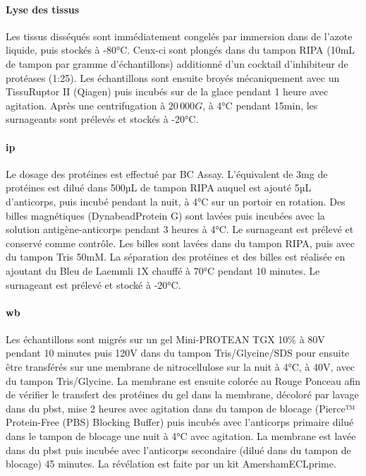 \paragraph{Lyse des tissus}
\label{par:lyse}
	Les tissus disséqués sont immédiatement congelés par immersion dans de l'azote liquide, puis stockés à -80°C. Ceux-ci sont plongés dans du tampon RIPA (10mL de tampon par gramme d'échantillons) additionné d'un cocktail d'inhibiteur de protéases (1:25). Les échantillons sont ensuite broyés mécaniquement avec un TissuRuptor II (Qiagen\textregistered) puis incubés sur de la glace pendant 1 heure avec agitation. Après une centrifugation à $20\,000G$, à 4°C pendant 15min, les surnageants sont prélevés et stockés à -20°C. 
	
\paragraph{\Acrlong{ip}}
\label{par:ip}
	Le dosage des protéines est effectué par BC Assay. L'équivalent de 3mg de protéines est dilué dans 500µL de tampon RIPA auquel est ajouté 5µL d'anticorps, puis incubé pendant la nuit, à 4°C sur un portoir en rotation. Des billes magnétiques (Dynabead\textregistered Protein G) sont lavées puis incubées avec la solution antigène-anticorps pendant 3 heures à 4°C. Le surnageant est prélevé et conservé comme contrôle. Les billes sont lavées dans du tampon RIPA, puis avec du tampon Tris 50mM. La séparation des protéines et des billes est réalisée en ajoutant du Bleu de Laemmli 1X chauffé à 70°C pendant 10 minutes. Le surnageant est prélevé et stocké à -20°C. 
	
\paragraph{\Acrlong{wb}}
\label{par:wb}
	Les échantillons sont migrés sur un gel Mini-PROTEAN\textregistered{}  TGX 10\% à 80V pendant 10 minutes puis 120V dans du tampon Tris/Glycine/SDS pour ensuite être transférés sur une membrane de nitrocellulose sur la nuit à 4°C, à 40V, avec du tampon Tris/Glycine. La membrane est ensuite colorée au Rouge Ponceau afin de vérifier le transfert des protéines du gel dans la membrane, décoloré par lavage dans du \acrshort{pbst}, mise 2 heures avec agitation dans du tampon de blocage (Pierce™ Protein-Free (PBS) Blocking Buffer) puis incubés avec l'anticorps primaire dilué dans le tampon de blocage une nuit à 4°C avec agitation. La membrane est lavée dans du \acrshort{pbst} puis incubée avec l'anticorps secondaire (dilué dans du tampon de blocage) 45 minutes. La révélation est faite par un kit Amersham\texttrademark ECL\texttrademark prime.
		
